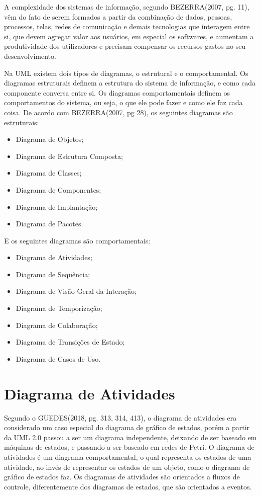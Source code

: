 \documentclass[12pt,openright,oneside,a4paper,
	chapter=TITLE,
	section=TITLE,
	english,brazil]{abntex2}
\begin{document}
A complexidade dos sistemas de informação, segundo BEZERRA(2007, pg. 11), vêm do fato de serem formados a partir da combinação de dados, pessoas, processos, telas, redes de comunicação e demais tecnologias que interagem entre si, que devem agregar valor aos usuários, em especial os softwares, e aumentam a produtividade dos utilizadores e precisam compensar os recursos gastos no seu desenvolvimento.

Na UML existem dois tipos de diagramas, o estrutural e o comportamental. Os diagramas estruturais definem a estrutura do sistema de informação, e como cada componente conversa entre si. Os diagramas comportamentais definem os comportamentos do sistema, ou seja, o que ele pode fazer e como ele faz cada coisa. De acordo com BEZERRA(2007, pg 28), os seguintes diagramas são estruturais:

\begin{itemize}
	\item Diagrama de Objetos;
	\item Diagrama de Estrutura Composta;
	\item Diagrama de Classes;
	\item Diagrama de Componentes;
	\item Diagrama de Implantação;
	\item Diagrama de Pacotes.
\end{itemize}

E os seguintes diagramas são comportamentais:

\begin{itemize}
	\item Diagrama de Atividades;
	\item Diagrama de Sequência;
	\item Diagrama de Visão Geral da Interação;
	\item Diagrama de Temporização;
	\item Diagrama de Colaboração;
	\item Diagrama de Transições de Estado;
	\item Diagrama de Casos de Uso.
\end{itemize}

\chapter{Diagrama de Atividades}

Segundo o GUEDES(2018, pg. 313, 314, 413), o diagrama de atividades era considerado um caso especial do diagrama de gráfico de estados, porém a partir da UML 2.0 passou a ser um diagrama independente, deixando de ser baseado em máquinas de estados, e passando a ser baseado em redes de Petri. O diagrama de atividades é um diagrama comportamental, o qual representa os estados de uma atividade, ao invés de representar os estados de um objeto, como o diagrama de gráfico de estados faz. Os diagramas de atividades são orientados a fluxos de controle, diferentemente dos diagramas de estados, que são orientados a eventos.
\end{document}

